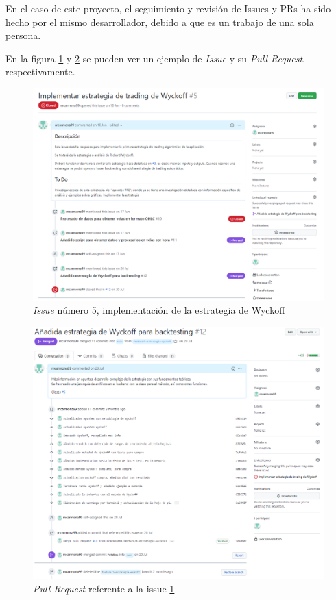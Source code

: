 En el caso de este proyecto, el seguimiento y revisión de Issues y PRs ha sido hecho por el mismo desarrollador, debido a que es un trabajo de una sola persona.\newline

En la figura \ref{issue} y \ref{pr} se pueden ver un ejemplo de \textit{Issue} y su \textit{Pull Request}, respectivamente.

\begin{figure}[h]
	\includegraphics[width=1.2\textwidth]{imagenes/issue_pr/issue.png}
	\caption{\textit{Issue} número 5, implementación de la estrategia de Wyckoff} \label{issue}
\end{figure}

\begin{figure}[h]
	\includegraphics[width=1.2\textwidth]{imagenes/issue_pr/pr.png}
	\caption{\textit{Pull Request} referente a la issue \ref{issue}} \label{pr}
\end{figure}

